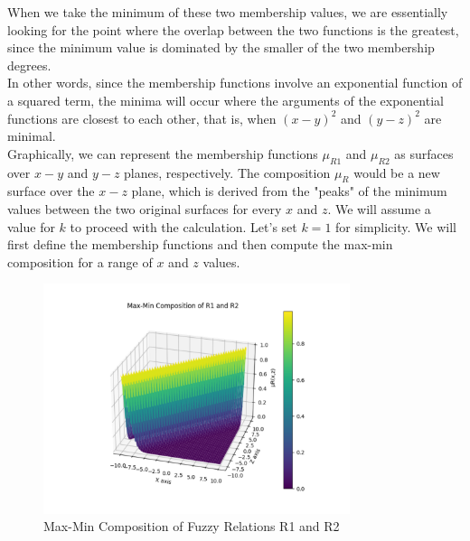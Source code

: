 When we take the minimum of these two membership values, we are essentially looking for the point where the overlap between the two functions is the greatest, since the minimum value is dominated by the smaller of the two membership degrees.
\\

In other words, since the membership functions involve an exponential function of a squared term, the minima will occur where the arguments of the exponential functions are closest to each other, that is, when $(x-y)^2$ and $(y-z)^2$
are minimal.
\\

Graphically, we can represent the membership functions $\mu_{R1}$ and $\mu_{R2}$ as surfaces over $x-y$ and $y-z$ planes, respectively. The composition $\mu_R$ would be a new surface over the $x-z$ plane, which is derived from the "peaks" of the minimum values between the two original surfaces for every $x$ and $z$. We will assume a value for $k$ to proceed with the calculation. Let's set $k=1$ for simplicity. We will first define the membership functions and then compute the max-min composition for a range of 
$x$ and 
$z$ values.

\begin{figure}[H]
	\centering
	\includegraphics[width=0.8\textwidth]{../Problem 10/minmax_plot.pdf}
	\caption{Max-Min Composition of Fuzzy Relations R1 and R2}
\end{figure}
	